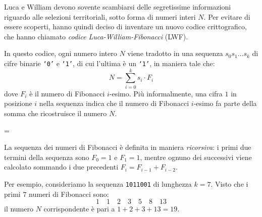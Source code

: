 \usepackage{xcolor}
\usepackage{afterpage}
\usepackage{pifont,mdframed}
\usepackage[bottom]{footmisc}



\renewcommand{\inputfile}{\texttt{input.txt}}
\renewcommand{\outputfile}{\texttt{output.txt}}

\newenvironment{warning}
  {\par\begin{mdframed}[linewidth=2pt,linecolor=gray]%
    \begin{list}{}{\leftmargin=1cm
                   \labelwidth=\leftmargin}\item[\Large\ding{43}]}
  {\end{list}\end{mdframed}\par}


{
\vspace{-1.75cm}\hfill{}
}
\vspace{.5cm}


Luca e William devono sovente scambiarsi delle segretissime informazioni riguardo alle selezioni territoriali, sotto forma di numeri interi $N$. Per evitare di essere scoperti, hanno quindi deciso di inventare un nuovo codice crittografico, che hanno chiamato \emph{codice Luca-William-Fibonacci} (LWF).

In questo codice, ogni numero intero $N$ viene tradotto in una sequenza $s_0 s_1 \ldots s_k$ di cifre binarie \texttt{`0'} e \texttt{`1'}, di cui l'ultima \`e un \texttt{`1'}, in maniera tale che:
\[
N = \sum_{i=0}^{k} s_i \cdot F_i
\]
dove $F_i$ \`e il numero di Fibonacci $i$-esimo. Pi\`u informalmente, una cifra $1$ in posizione $i$ nella sequenza indica che il numero di Fibonacci $i$-esimo fa parte della somma che ricostruisce il numero $N$.

\begin{warning}
	La sequenza dei numeri di Fibonacci \`e definita in maniera \emph{ricorsiva}: i primi due termini della sequenza sono $F_0 = 1$ e $F_1 = 1$, mentre ognuno dei successivi viene calcolato sommando i due precedenti $F_{i} = F_{i-1} + F_{i-2}$.
\end{warning}

Per esempio, consideriamo la sequenza \texttt{1011001} di lunghezza $k = 7$. Visto che i primi $7$ numeri di Fibonacci sono:
\[
1 \quad 1 \quad 2 \quad 3 \quad 5 \quad 8 \quad 13
\]
il numero $N$ corrispondente \`e pari a $1 + 2 + 3 + 13 = 19$.

